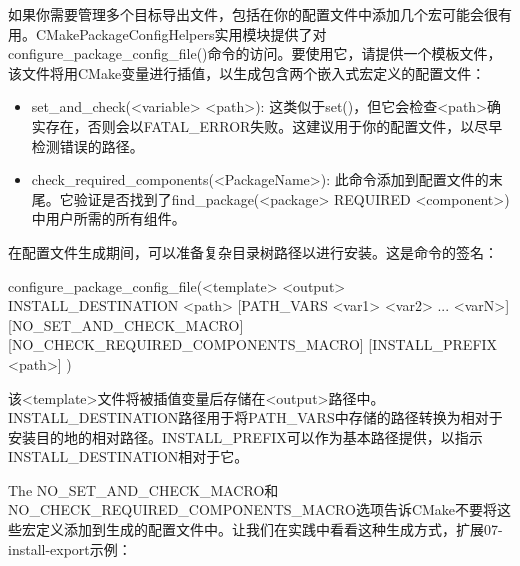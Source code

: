 
如果你需要管理多个目标导出文件，包括在你的配置文件中添加几个宏可能会很有用。CMakePackageConfigHelpers实用模块提供了对configure\_package\_config\_file()命令的访问。要使用它，请提供一个模板文件，该文件将用CMake变量进行插值，以生成包含两个嵌入式宏定义的配置文件：

\begin{itemize}
\item
set\_and\_check(<variable> <path>): 这类似于set()，但它会检查<path>确实存在，否则会以FATAL\_ERROR失败。这建议用于你的配置文件，以尽早检测错误的路径。

\item
check\_required\_components(<PackageName>): 此命令添加到配置文件的末尾。它验证是否找到了find\_package(<package> REQUIRED <component>)中用户所需的所有组件。
\end{itemize}

在配置文件生成期间，可以准备复杂目录树路径以进行安装。这是命令的签名：

\begin{shell}
configure_package_config_file(<template> <output>
    INSTALL_DESTINATION <path>
    [PATH_VARS <var1> <var2> ... <varN>]
    [NO_SET_AND_CHECK_MACRO]
    [NO_CHECK_REQUIRED_COMPONENTS_MACRO]
    [INSTALL_PREFIX <path>]
)
\end{shell}

该<template>文件将被插值变量后存储在<output>路径中。INSTALL\_DESTINATION路径用于将PATH\_VARS中存储的路径转换为相对于安装目的地的相对路径。INSTALL\_PREFIX可以作为基本路径提供，以指示INSTALL\_DESTINATION相对于它。

The NO\_SET\_AND\_CHECK\_MACRO和NO\_CHECK\_REQUIRED\_COMPONENTS\_MACRO选项告诉CMake不要将这些宏定义添加到生成的配置文件中。让我们在实践中看看这种生成方式，扩展07-install-export示例：



